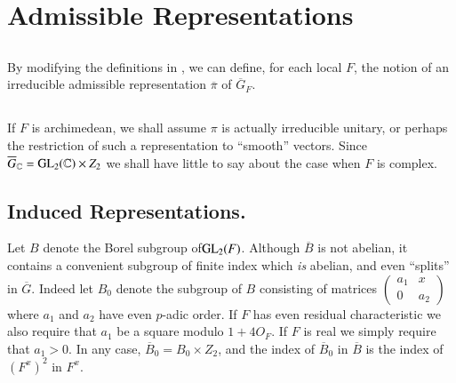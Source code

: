 \section{Admissible Representations}\label{art1-sec2}

\subsection{}\label{art1-sec2.1}
By modifying the definitions in \cite{Jacquet-Langlands}, we can define, for each local $F$, the notion of an irreducible admissible representation $\overline{\pi}$ of $\overline{G}_{F}$.

\subsection{}\label{art1-sec2.2}
If $F$ is archimedean, we shall assume $\pi$ is actually irreducible unitary, or perhaps the restriction of such a representation to ``smooth'' vectors. Since $\overline{G}_{\mathbb{C}}=\mathrm{GL}_{2}(\mathbb{C})\times Z_{2}$ we shall have little to say about the case when $F$ is complex.

\subsection{Induced Representations.}\label{art1-sec2.3}
Let $B$ denote the Borel subgroup of\break $\mathrm{GL}_{2}(F)$. Although $\overline{B}$ is not abelian, it contains a convenient subgroup of finite index which {\em is} abelian, and even ``splits'' in $\overline{G}$. Indeed let $B_{0}$ denote the subgroup of $B$ consisting of matrices $\left(\begin{smallmatrix} a_{1} & x\\ 0 & a_{2}\end{smallmatrix}\right)$ where $a_{1}$ and $a_{2}$ have even $p$-adic order. If $F$ has even residual characteristic we also require that $a_{1}$ be a square modulo $1+4O_{F}$. If $F$ is real we simply require that $a_{1}>0$. In any case, $\overline{B}_{0}=B_{0}\times Z_{2}$, and the index of $\overline{B}_{0}$ in $\overline{B}$ is the index of $(F^{x})^{2}$ in $F^{x}$.

